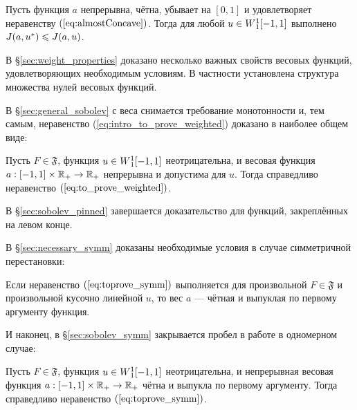 \begin{thm}
Пусть функция $a$ непрерывна, чётна, убывает на $[0, 1]$ и удовлетворяет неравенству $(\ref{eq:almostConcave})$.
Тогда для любой $u \in W{}_1^1[-1, 1]$ выполнено $J( a, u^* ) \leqslant J( a, u )$.
\end{thm}

В \S\ref{sec:weight_properties} доказано несколько важных свойств весовых функций, удовлетворяющих необходимым условиям.
В частности установлена структура множества нулей весовых функций.

В \S\ref{sec:general_sobolev} с веса снимается требование монотонности и, тем самым,
неравенство (\ref{eq:intro_to_prove_weighted}) доказано в наиболее общем виде:

\begin{thm}
Пусть $F \in \mathfrak{F}$, функция $u \in W{}_1^1[-1, 1]$ неотрицательна,
и весовая функция $a: [-1, 1] \times \mathbb R_+ \to \mathbb R_+$ непрерывна
и допустима для $u$.
Тогда справедливо неравенство $(\ref{eq:to_prove_weighted})$.
\end{thm}

В \S\ref{sec:sobolev_pinned} завершается доказательство для функций, закреплённых на левом конце.

В \S\ref{sec:necessary_symm} доказаны необходимые условия в случае симметричной перестановки:

\begin{thm}
Если неравенство $(\ref{eq:toprove_symm})$ выполняется для произвольной $F \in \mathfrak{F}$ и произвольной кусочно линейной $u$,
то вес $a$ --- чётная и выпуклая по первому аргументу функция.
\end{thm}

И наконец, в \S\ref{sec:sobolev_symm} закрывается пробел в работе \cite{Brock} в одномерном случае:
\begin{thm}
Пусть $F \in \mathfrak{F}$, функция $u \in W{}_1^1[-1, 1]$ неотрицательна,
и непрерывная весовая функция $a: [-1, 1] \times \mathbb R_+ \to \mathbb R_+$ чётна и выпукла по первому аргументу.
Тогда справедливо неравенство $(\ref{eq:toprove_symm})$.
\end{thm}



